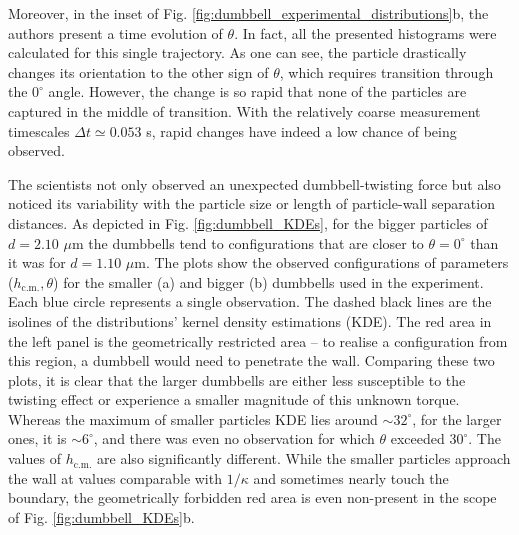 \documentclass{master_thesis}
\begin{document}
Moreover, in the inset of Fig. \ref{fig:dumbbell_experimental_distributions}b, the authors present a time evolution of $\theta$. In fact, all the presented histograms were calculated for this single trajectory. As one can see, the particle drastically changes its orientation to the other sign of $\theta$, which requires transition through the $0^{\circ}$ angle. However, the change is so rapid that none of the particles are captured in the middle of transition. With the relatively coarse measurement timescales $\Delta t\simeq 0.053$ s, rapid changes have indeed a low chance of being observed.

The scientists not only observed an unexpected dumbbell-twisting force but also noticed its variability with the particle size or length of particle-wall separation distances. As depicted in Fig. \ref{fig:dumbbell_KDEs}, for the bigger particles of $d=2.10$ $\mu$m the dumbbells tend to configurations that are closer to $\theta=0^{\circ}$ than it was for $d=1.10$ $\mu$m. The plots show the observed configurations of parameters ($h_{\textrm{c.m.}}, \theta$) for the smaller (a) and bigger (b) dumbbells used in the experiment. Each blue circle represents a single observation. The dashed black lines are the isolines of the distributions' kernel density estimations (KDE). The red area in the left panel is the geometrically restricted area -- to realise a configuration from this region, a dumbbell would need to penetrate the wall. Comparing these two plots, it is clear that the larger dumbbells are either less susceptible to the twisting effect or experience a smaller magnitude of this unknown torque. Whereas the maximum of smaller particles KDE lies around $\sim 32^{\circ}$, for the larger ones, it is $\sim 6^{\circ}$, and there was even no observation for which $\theta$ exceeded $30^{\circ}$. The values of $h_{\textrm{c.m.}}$ are also significantly different. While the smaller particles approach the wall at values comparable with $1/\kappa$ and sometimes nearly touch the boundary, the geometrically forbidden red area is even non-present in the scope of Fig. \ref{fig:dumbbell_KDEs}b.
\end{document}
